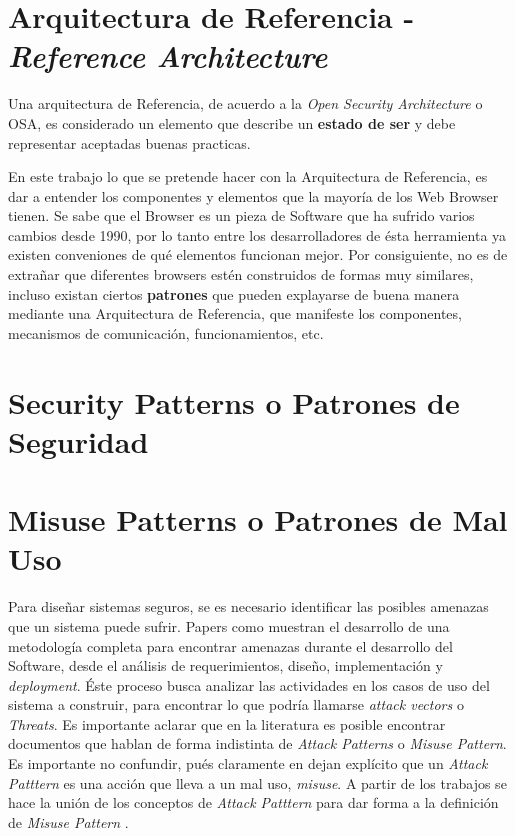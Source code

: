 \section{Arquitectura de Referencia - \textit{Reference Architecture}}
Una arquitectura de Referencia, de acuerdo a la \textit{Open Security Architecture} o OSA\cite{openSecArch}, es considerado un elemento que describe un \textbf{estado de ser} y debe representar aceptadas buenas practicas. 

En este trabajo lo que se pretende hacer con la Arquitectura de Referencia, es dar a entender los componentes y elementos que la mayoría de los Web Browser tienen. Se sabe que el Browser es un pieza de Software que ha sufrido varios cambios desde 1990, por lo tanto entre los desarrolladores de ésta herramienta ya existen conveniones de qué elementos funcionan mejor. Por consiguiente, no es de extrañar que diferentes browsers estén construidos de formas muy similares, incluso existan ciertos \textbf{patrones} que pueden explayarse de buena manera mediante una Arquitectura de Referencia, que manifeste los componentes, mecanismos de comunicación, funcionamientos, etc.

\section{Security Patterns o Patrones de Seguridad}

\section{Misuse Patterns o Patrones de Mal Uso}
Para diseñar sistemas seguros, se es necesario identificar las posibles amenazas que un sistema puede sufrir. Papers como \cite{fernandez2013security, fernandez2006defining, fernandez2007attack, braz2008eliciting} muestran el desarrollo de una metodología completa para encontrar amenazas durante el desarrollo del Software, desde el análisis de requerimientos, diseño, implementación y \textit{deployment}. Éste proceso busca analizar las actividades en los casos de uso del sistema a construir, para encontrar lo que podría llamarse \textit{attack vectors} o \textit{Threats}. Es importante aclarar que en la literatura es posible encontrar documentos que hablan de forma indistinta de \textit{Attack Patterns} o \textit{Misuse Pattern}. Es importante no confundir, pués claramente en \cite{ModMisusePatt} dejan explícito que un \textit{Attack Patttern} es una acción que lleva a un mal uso, \textit{misuse}. A partir de los trabajos \cite{fernandez2007attack, yoshioka2006development, yoshioka2007integration}  se hace la unión de los conceptos de \textit{Attack Patttern} para dar forma a la definición de \textit{Misuse Pattern} \cite{ModMisusePatt, pelaez2009misuse, fernandez2010worm, hashizume2011misuse, munoz2011misuse, fernandez2012misuse, alkazimi2014, encinamisuse}.

